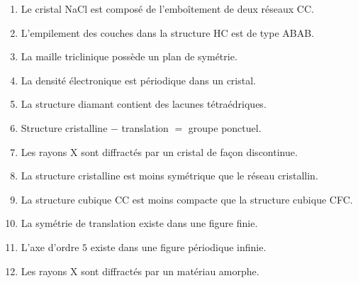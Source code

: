 \documentclass[12pt,a4paper]{article}
\begin{document}
\begin{boiteexercice}
\begin{enumerate}
\item Le cristal NaCl est composé de l'emboîtement de deux réseaux CC.
\item L'empilement des couches dans la structure HC est de type ABAB.
\item La maille triclinique possède un plan de symétrie.
\item La densité électronique est périodique dans un cristal.
\item La structure diamant contient des lacunes tétraédriques.
\item Structure cristalline $-$ translation $=$ groupe ponctuel.
\item Les rayons X sont diffractés par un cristal de façon discontinue.
\item La structure cristalline est moins symétrique que le réseau cristallin.
\item La structure cubique CC est moins compacte que la structure cubique CFC.
\item La symétrie de translation existe dans une figure finie.
\item L'axe d'ordre $5$ existe dans une figure périodique infinie.
\item Les rayons X sont diffractés par un matériau amorphe.
\end{enumerate}
\end{boiteexercice}
\end{document}
